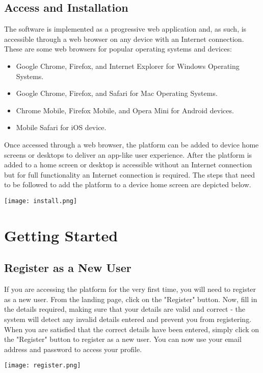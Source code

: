 \documentclass[12pt]{article}
\begin{document}
\subsection{Access and Installation}
The software is implemented as a progressive web application and, as such, is accessible through a web
browser on any device with an Internet connection. These are some web browsers for popular operating
systems and devices:
\begin{itemize}
\item Google Chrome, Firefox, and Internet Explorer for Windows Operating Systems.
\item Google Chrome, Firefox, and Safari for Mac Operating Systems.
\item Chrome Mobile, Firefox Mobile, and Opera Mini for Android devices.
\item Mobile Safari for iOS device.
\end{itemize}
Once accessed through a web browser, the platform can be added to device home screens or desktops
to deliver an app-like user experience. After the platform is added to a home screen or desktop is
accessible without an Internet connection but for full functionality an Internet connection is required.
The steps that need to be followed to add the platform to a device home screen are depicted below.
\begin{center}
\texttt{[image: install.png]}
\end{center}

\section{Getting Started}
\subsection{Register as a New User}
If you are accessing the platform for the very first time, you will need to register as a new user. From the landing page, click on the "Register" button. Now, fill in the details required, making sure that your details are valid and correct - the system will detect any invalid details entered and prevent you from registering. When you are satisfied that the correct details have been entered, simply click on the "Register" button to register as a new user. You can now use your email address and password to access your profile.
\begin{center}
\texttt{[image: register.png]}
\end{center}
\end{document}
